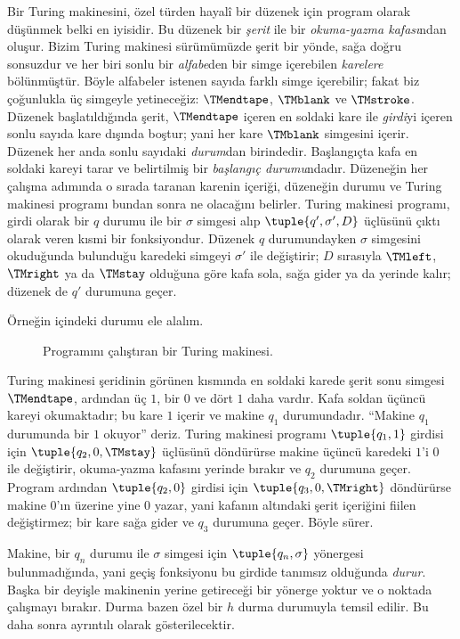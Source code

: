 \documentclass[../../../include/open-logic-section]{subfiles}
\begin{document}
\begin{explain}
Bir Turing makinesini, özel türden hayalî bir düzenek için program olarak
düşünmek belki en iyisidir. Bu düzenek bir \emph{şerit} ile bir
\emph{okuma-yazma kafası}ndan oluşur. Bizim Turing makinesi sürümümüzde şerit
bir yönde, sağa doğru sonsuzdur ve her biri sonlu bir \emph{alfabe}den bir
simge içerebilen \emph{karelere} bölünmüştür. Böyle alfabeler istenen sayıda
farklı simge içerebilir; fakat biz çoğunlukla üç simgeyle yetineceğiz:
$\TMendtape$, $\TMblank$ ve $\TMstroke$. Düzenek başlatıldığında şerit,
$\TMendtape$ içeren en soldaki kare ile \emph{girdi}yi içeren sonlu sayıda
kare dışında boştur; yani her kare $\TMblank$ simgesini içerir. Düzenek her
anda sonlu sayıdaki \emph{durum}dan birindedir. Başlangıçta kafa en soldaki
kareyi tarar ve belirtilmiş bir \emph{başlangıç durumu}ndadır. Düzeneğin her
çalışma adımında o sırada taranan karenin içeriği, düzeneğin durumu ve Turing
makinesi programı bundan sonra ne olacağını belirler. Turing makinesi programı,
girdi olarak bir $q$ durumu ile bir $\sigma$ simgesi alıp
$\tuple{q',\sigma',D}$ üçlüsünü çıktı olarak veren kısmi bir fonksiyondur.
Düzenek $q$ durumundayken $\sigma$ simgesini okuduğunda bulunduğu karedeki
simgeyi $\sigma'$ ile değiştirir; $D$ sırasıyla $\TMleft$, $\TMright$ ya da
$\TMstay$ olduğuna göre kafa sola, sağa gider ya da yerinde kalır; düzenek
de $q'$ durumuna geçer.

Örneğin  içindeki durumu ele alalım.
\begin{figure}
  \caption{Programını çalıştıran bir Turing makinesi.}
\end{figure}
Turing makinesi şeridinin görünen kısmında en soldaki karede şerit sonu
simgesi $\TMendtape$, ardından üç $1$, bir $0$ ve dört $1$ daha vardır.
Kafa soldan üçüncü kareyi okumaktadır; bu kare $1$ içerir ve makine
$q_1$ durumundadır. ``Makine $q_1$ durumunda bir $1$ okuyor'' deriz. Turing
makinesi programı $\tuple{q_1,1}$ girdisi için
$\tuple{q_2,0,\TMstay}$ üçlüsünü döndürürse makine üçüncü karedeki $1$'i
$0$ ile değiştirir, okuma-yazma kafasını yerinde bırakır ve $q_2$ durumuna
geçer. Program ardından $\tuple{q_2,0}$ girdisi için
$\tuple{q_3,0,\TMright}$ döndürürse makine $0$'ın üzerine yine $0$ yazar,
yani kafanın altındaki şerit içeriğini fiilen değiştirmez; bir kare sağa
gider ve $q_3$ durumuna geçer. Böyle sürer.

Makine, bir $q_n$ durumu ile $\sigma$ simgesi için
$\tuple{q_n,\sigma}$ yönergesi bulunmadığında, yani geçiş fonksiyonu bu
girdide tanımsız olduğunda \emph{durur}. Başka bir deyişle makinenin yerine
getireceği bir yönerge yoktur ve o noktada çalışmayı bırakır. Durma bazen
özel bir $h$ durma durumuyla temsil edilir. Bu daha sonra ayrıntılı olarak
gösterilecektir.
\end{explain}
\end{document}

